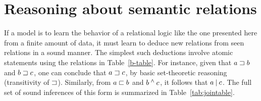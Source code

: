 \section{Reasoning about semantic relations}\label{sec:join}

If a model is to learn the behavior of a relational logic like the one
presented here from a finite amount of data, it must learn to deduce new
relations from seen relations in a sound manner. The simplest such
deductions involve atomic statements using the relations in
Table~\ref{b-table}. For instance, given that $a \sqsupset b$ and $b
\sqsupset c$, one can conclude that $a \sqsupset c$, by basic
set-theoretic reasoning (transitivity of $\sqsupset$). Similarly, from
$a \sqsubset b$ and $b \mathbin{^{\wedge}} c$, it follows that $a \mathbin{|} c$.  The
full set of sound inferences of this form is summarized in
Table~\ref{tab:jointable}.


